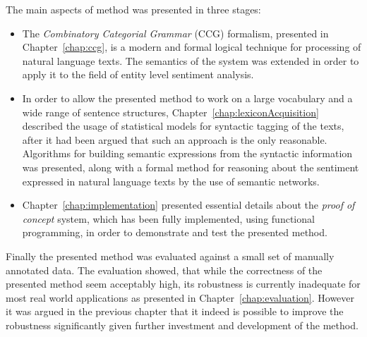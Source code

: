 The main aspects of method was presented in three stages:%
\begin{itemize}
\item The \emph{Combinatory Categorial Grammar} (CCG) formalism,  presented in Chapter~\ref{chap:ccg}, is a modern and formal logical technique for processing of natural language texts. The semantics of the system was extended in order to apply it to the field of entity level sentiment analysis.

\item In order to allow the presented method to work on a large vocabulary and a wide range of sentence structures, Chapter~\ref{chap:lexiconAcquisition} described the usage of statistical models for syntactic tagging of the texts, after it had been argued that such an approach is the only reasonable. Algorithms for building semantic expressions from the syntactic information was presented, along with a formal method for reasoning about the sentiment expressed in natural language texts by the use of semantic networks.

\item Chapter~\ref{chap:implementation} presented essential details about the \emph{proof of concept} system, which has been fully implemented, using functional programming, in order to demonstrate and test the presented method.
\end{itemize}

Finally the presented method was evaluated against a small set of manually annotated data. The evaluation showed, that while the correctness of the presented method seem acceptably high, its robustness is currently inadequate for most real world applications as presented in Chapter~\ref{chap:evaluation}. However it was argued in the previous chapter that it indeed is possible to improve the robustness significantly given further investment and development of the method.
